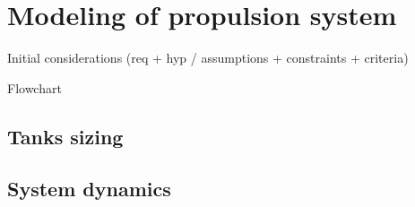 \section{Modeling of propulsion system}
\label{sec:modeling}

Initial considerations (req + hyp / assumptions + constraints + criteria)

Flowchart

\subsection{Tanks sizing}
\label{subsec:tanks}

\subsection{System dynamics}
\label{subsec:dynamics}

